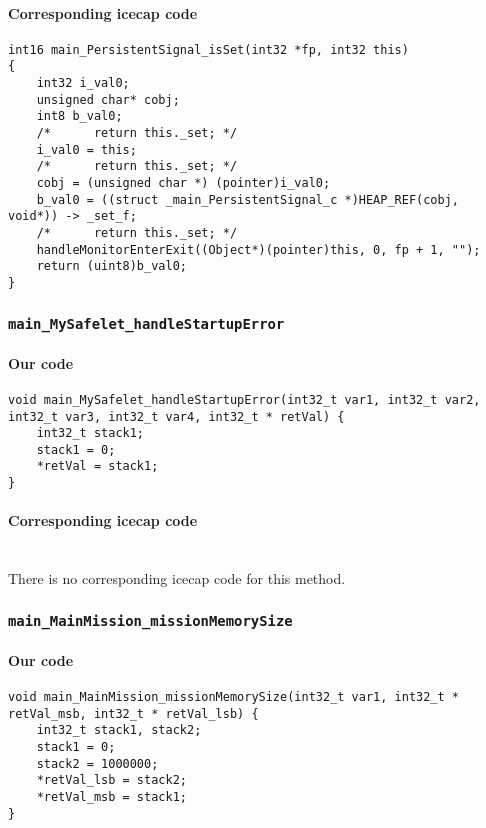 \begin{landscape}
\begin{multicols}{2}
\paragraph{Corresponding icecap code}\hfill
\begin{lstlisting}[firstnumber=54620]
int16 main_PersistentSignal_isSet(int32 *fp, int32 this)
{
	int32 i_val0;
	unsigned char* cobj;
	int8 b_val0;
	/*		return this._set; */
	i_val0 = this;
	/*		return this._set; */
	cobj = (unsigned char *) (pointer)i_val0;
	b_val0 = ((struct _main_PersistentSignal_c *)HEAP_REF(cobj, void*)) -> _set_f;
	/*		return this._set; */
	handleMonitorEnterExit((Object*)(pointer)this, 0, fp + 1, "");
	return (uint8)b_val0;
}
\end{lstlisting}

\subsubsection{\texttt{main\_MySafelet\_handleStartupError}}

\paragraph{Our code}\hfill
\begin{lstlisting}[firstnumber=1177]
void main_MySafelet_handleStartupError(int32_t var1, int32_t var2, int32_t var3, int32_t var4, int32_t * retVal) {
	int32_t stack1;
	stack1 = 0;
	*retVal = stack1;
}
\end{lstlisting}

\paragraph{Corresponding icecap code}\hfill\\
There is no corresponding icecap code for this method.

\subsubsection{\texttt{main\_MainMission\_missionMemorySize}}

\paragraph{Our code}\hfill
\begin{lstlisting}[firstnumber=1256]
void main_MainMission_missionMemorySize(int32_t var1, int32_t * retVal_msb, int32_t * retVal_lsb) {
	int32_t stack1, stack2;
	stack1 = 0;
	stack2 = 1000000;
	*retVal_lsb = stack2;
	*retVal_msb = stack1;
}
\end{lstlisting}


\end{multicols}
\end{landscape}
